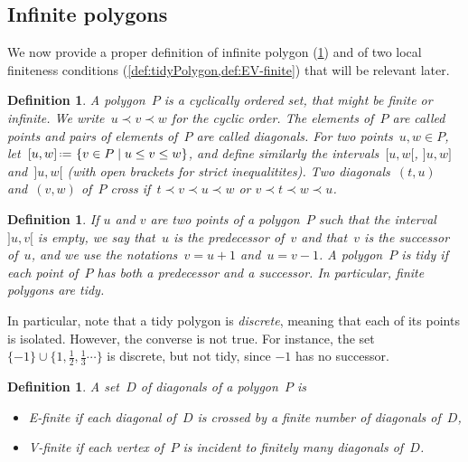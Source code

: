 \documentclass{amsart}
\newtheorem{definition}[theorem]{Definition}
\theoremstyle{remark}
\newcommand{\darkblue}{\color{darkblue}} %
\newcommand{\defn}[1]{\textsl{\darkblue #1}} %
\newcommand{\set}[2]{\left\{ #1 \;\middle|\; #2 \right\}} %
\newcommand{\eqdef}{\mbox{\,\raisebox{0.2ex}{\scriptsize\ensuremath{\mathrm:}}\ensuremath{=}\,}} %
\newcommand*{\ef}[0]{E-finite\xspace}
\newcommand*{\vf}[0]{V-finite\xspace}
\newcommand{\cl}{\prec}
\begin{document}

\subsection{Infinite polygons}

We now provide a proper definition of infinite polygon (\cref{def:infinitePolygon}) and of two local finiteness conditions (\cref{def:tidyPolygon,def:EV-finite}) that will be relevant later.

\begin{definition}
\label{def:infinitePolygon}
A \defn{polygon}~$P$ is a cyclically ordered set, that might be finite or infinite.
We write~$u \cl v \cl w$ for the cyclic order.
The elements of~$P$ are called \defn{points} and pairs of elements of~$P$ are called \defn{diagonals}.
For two points~$u,w \in P$, let~$[u,w] \eqdef \set{v \in P}{u \le v \le w}$, and define similarly the intervals~$[u,w[$, $]u,w]$ and~$]u,w[$ (with open brackets for strict inequalitites).
Two diagonals~$(t,u)$ and~$(v,w)$ of~$P$ \defn{cross} if~$t \cl v \cl u \cl w$ or $v \cl t \cl w \cl u$.
\end{definition}

\begin{definition}
\label{def:tidyPolygon}
If $u$ and $v$ are two points of a polygon~$P$ such that the interval~$]u,v[$ is empty, we say that~$u$ is the \defn{predecessor} of~$v$ and that~$v$ is the \defn{successor} of~$u$, and we use the notations~$v = u+1$ and~$u = v-1$. A polygon~$P$ is \defn{tidy} if each point of~$P$ has both a predecessor and a successor. In particular, finite polygons are tidy.
\end{definition}

In particular, note that a tidy polygon is \defn{discrete}, meaning that each of its points is isolated. However, the converse is not true. For instance, the set $\{-1\}\cup \{1, \frac{1}{2},\frac{1}{3}\cdots\}$ is discrete, but not tidy, since $-1$ has no successor.

\begin{definition}
\label{def:EV-finite}
A set~$D$ of diagonals of a polygon~$P$ is 
\begin{itemize}
\item \defn{\ef} if each diagonal of~$D$ is crossed by a finite number of diagonals of~$D$,
\item \defn{\vf} if each vertex of~$P$ is incident to finitely many diagonals of~$D$.
\end{itemize}
\end{definition}
\end{document}
